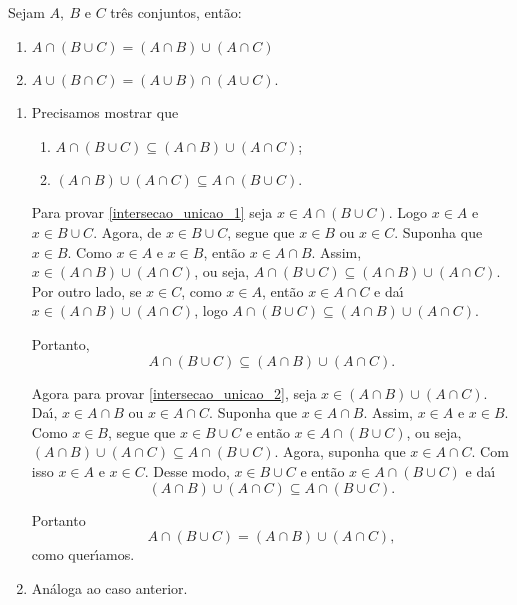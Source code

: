 \begin{proposicao} Sejam $A,\ B$ e $C$ tr{\^e}s conjuntos, ent{\~a}o:
	\begin{enumerate}[label={\roman*})]
		\item $A \cap (B \cup C) = (A \cap B) \cup (A \cap C)$
		\item $A \cup (B \cap C) = (A \cup B) \cap (A \cup C)$.
	\end{enumerate}
\end{proposicao}
\begin{prova}
	\begin{enumerate}[label={\roman*})]
		\item Precisamos mostrar que
		\begin{enumerate}[label=({\arabic*})]
			\item $A\cap(B\cup C)\subseteq(A\cap B)\cup(A\cap C)$;\label{intersecao_unicao_1}
			\item $(A\cap B)\cup(A\cap C)\subseteq A\cap(B\cup C).$\label{intersecao_unicao_2}
		\end{enumerate}

		Para provar \ref{intersecao_unicao_1} seja $x\in A \cap (B \cup C)$. Logo $x\in A$ e $x\in B\cup C$. Agora, de $x\in B\cup C$, segue que $x\in B$ ou $x\in C$. Suponha que $x\in B$. Como $x\in A$ e $x \in B$, ent\~ao $x\in A\cap B$. Assim, $x\in(A\cap B)\cup(A\cap C)$, ou seja, $A\cap(B\cup C)\subseteq(A\cap B)\cup(A\cap C)$. Por outro lado, se $x\in C$, como $x\in A$, ent{\~a}o $x\in A\cap C$ e da{\'\i} $x\in(A\cap B)\cup(A\cap C)$, logo $A\cap(B\cup C)\subseteq(A\cap B)\cup(A\cap C)$.

		Portanto,
		\[
			A\cap(B\cup C)\subseteq(A\cap B)\cup(A\cap C).
		\]

		Agora para provar \ref{intersecao_unicao_2}, seja $x\in(A\cap B)\cup(A\cap C)$. Da{\'\i}, $x\in A\cap B$ ou $x\in A\cap C$. Suponha que $x\in A\cap B$. Assim, $x\in A$ e $x\in B$. Como $x\in B$, segue que $x\in B\cup C$ e ent{\~a}o $x\in A\cap(B\cup C)$, ou seja, $(A\cap B)\cup(A\cap C)\subseteq A\cap(B\cup C)$. Agora, suponha que $x\in A\cap C$. Com isso $x\in A$ e $x\in C$. Desse modo, $x\in B\cup C$ e ent{\~a}o $x\in A\cap(B\cup C)$ e da{\'\i}
		\[
			(A\cap B)\cup(A\cap C)\subseteq A\cap(B\cup C).
		\]

		Portanto
		\[
			A\cap(B\cup C)=(A\cap B)\cup(A\cap C),
		\]
		como quer{\'\i}amos.
		\item An\'aloga ao caso anterior.
	\end{enumerate}
\end{prova}

